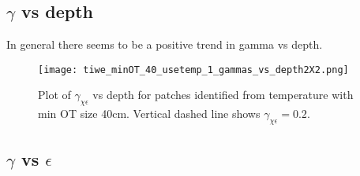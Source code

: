 \documentclass[11pt]{article}
\begin{document}
%
%
%
%
%
%
%
%








\clearpage
\subsection{$\gamma$ vs depth}

In general there seems to be a positive trend in gamma vs depth.

\begin{figure}[htbp]
\texttt{[image: tiwe\_minOT\_40\_usetemp\_1\_gammas\_vs\_depth2X2.png]}
\caption{Plot of $\gamma_{\chi\epsilon}$ vs depth for patches identified from temperature with min OT size 40cm. Vertical dashed line shows $\gamma_{\chi\epsilon}=0.2$. }
\label{patch_gam_vs_depth}
\end{figure}


\clearpage
\subsection{$\gamma$ vs $\epsilon$}
\end{document}
